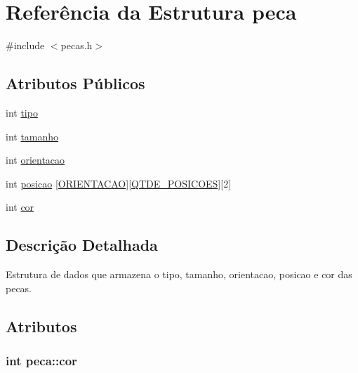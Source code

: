 \hypertarget{structpeca}{}\section{Referência da Estrutura peca}
\label{structpeca}


{\ttfamily \#include $<$pecas.\+h$>$}

\subsection*{Atributos Públicos}
\begin{DoxyCompactItemize}
\item 
int \hyperlink{structpeca_a5cfcc69ec4548de975da53ea3e8dd10e}{tipo}
\item 
int \hyperlink{structpeca_a98fca9b307508256052040ca10395534}{tamanho}
\item 
int \hyperlink{structpeca_abaea72a99b0c8e6ec7c3863ca79f0d3a}{orientacao}
\item 
int \hyperlink{structpeca_a4a244e3f32719c0d170c9736bd083568}{posicao} \mbox{[}\hyperlink{pecas_8h_a1cd88439ea390b7a0ec84171ee1100c7}{O\+R\+I\+E\+N\+T\+A\+C\+A\+O}\mbox{]}\mbox{[}\hyperlink{pecas_8h_a3f8d1a0082b0d6d8103cbaf48fe4bb85}{Q\+T\+D\+E\+\_\+\+P\+O\+S\+I\+C\+O\+E\+S}\mbox{]}\mbox{[}2\mbox{]}
\item 
int \hyperlink{structpeca_a49492e416fc3dff1d650b33ce270552e}{cor}
\end{DoxyCompactItemize}


\subsection{Descrição Detalhada}
Estrutura de dados que armazena o tipo, tamanho, orientacao, posicao e cor das pecas. 

\subsection{Atributos}
\hypertarget{structpeca_a49492e416fc3dff1d650b33ce270552e}{}
\subsubsection[{cor}]{\setlength{\rightskip}{0pt plus 5cm}int peca\+::cor}\label{structpeca_a49492e416fc3dff1d650b33ce270552e}
\hypertarget{structpeca_abaea72a99b0c8e6ec7c3863ca79f0d3a}{}

